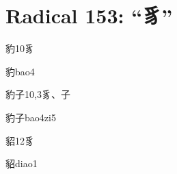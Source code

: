
\section*{Radical 153: ``⾘''}

\begin{entry}{豹}{10}{⾘}
  \begin{phonetics}{豹}{bao4}
  \end{phonetics}
\end{entry}

\begin{entry}{豹子}{10,3}{⾘、⼦}
  \begin{phonetics}{豹子}{bao4zi5}
  \end{phonetics}
\end{entry}

\begin{entry}{貂}{12}{⾘}
  \begin{phonetics}{貂}{diao1}
  \end{phonetics}
\end{entry}


